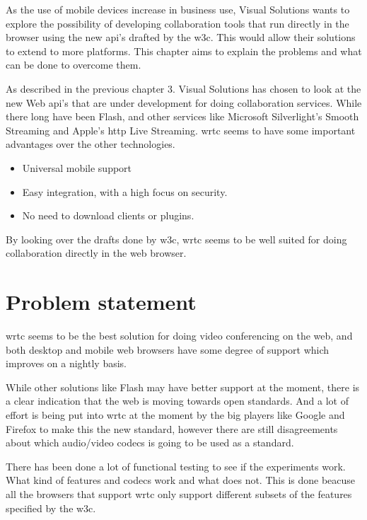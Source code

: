 
As the use of mobile devices increase in business use, Visual Solutions wants to explore the possibility of developing collaboration tools that run directly in the browser using the new \gls{api}'s drafted by the \gls{w3c}. This would allow their solutions to extend to more platforms. This chapter aims to explain the problems and what can be done to overcome them.

As described in the previous chapter 3. Visual Solutions has chosen to look at the new Web \gls{api}'s that are under development for doing collaboration services. While there long have been Flash, and other services like Microsoft Silverlight's Smooth Streaming and Apple's \gls{http} Live Streaming. \gls{wrtc} seems to have some important advantages over the other technologies.

\begin{itemize}
    \item Universal mobile support
    \item Easy integration, with a high focus on security.
    \item No need to download clients or plugins.
\end{itemize}

By looking over the drafts done by \gls{w3c}, \gls{wrtc} seems to be well suited for doing collaboration directly in the web browser.

\section{Problem statement}
\gls{wrtc} seems to be the best solution for doing video conferencing on the web, and both desktop and mobile web browsers have some degree of support which improves on a nightly basis.

While other solutions like Flash may have better support at the moment, there is a clear indication that the web is moving towards open standards. And a lot of effort is being put into \gls{wrtc} at the moment by the big players like Google and Firefox to make this the new standard, however there are still disagreements about which audio/video codecs is going to be used as a standard.

There has been done a lot of functional testing to see if the experiments work. What kind of features and codecs work and what does not. This is done beacuse all the browsers that support \gls{wrtc} only support different subsets of the features specified by the \gls{w3c}. 

